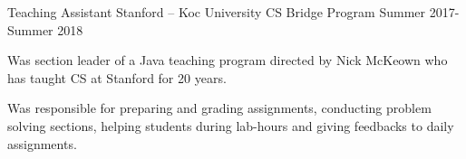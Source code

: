 \begin{cventries}
{    }
\vspace{-0.5mm}
  \cventry
    {Teaching Assistant } %
    {Stanford – Koc University CS Bridge Program} %
    {} %
    {Summer 2017-Summer 2018} %
    {
      \begin{cvitems} %
        \item {Was section leader of a Java teaching program directed by Nick McKeown who has taught CS at Stanford for 20 years.}
        \item {Was responsible for preparing and grading assignments, conducting problem solving sections, helping students during lab-hours and giving feedbacks to daily assignments.}
      \end{cvitems}
    }
    

\begin{comment}
Commented code

\cventry
    {Member} %
    {Association for Computing Machinery Society} %
    {Koc Universtiy} %
    {Oct. 2017 - Present} %
    {
      \begin{cvitems} %
        \item {Responsible for organizing IoT and robotics related workshops, conferences for new members. }
        \item {Developing tech-projects to attend national and international competitions. }
      \end{cvitems}
    }

  \cventry
    {Global Volunteer in Egypt } %
    {AIESEC} %
    {Cairo, Egypt} %
    {Summer 2015} %
    {
      \begin{cvitems} %
        \item {Was a member of an international team of 30 people which was responsible from building a school from throw-out materials in a poor island in Egypt. }
      \end{cvitems}
    }

\end{comment}
\end{cventries}
